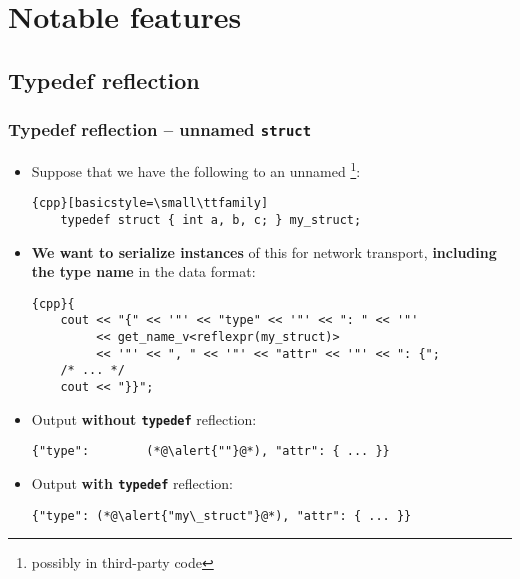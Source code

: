 \documentclass[compress,table,xcolor=table]{beamer}
\begin{document}
\section{Notable features}

\subsection{Typedef reflection}
\begin{frame}[fragile]
\frametitle{Typedef reflection -- unnamed \texttt{struct}}
  \small
  \begin{itemize}
    \item Suppose that we have the following \verb@typedef@ to an unnamed
      \verb@struct@\footnote{possibly in third-party code}:
    \begin{lstlisting}{cpp}[basicstyle=\small\ttfamily]
	typedef struct { int a, b, c; } my_struct;
    \end{lstlisting}
    \item \textbf{We want to serialize instances} of this \verb@struct@
      for network transport, \textbf{including the type name} in the data format:
      \begin{lstlisting}{cpp}{
	cout << "{" << '"' << "type" << '"' << ": " << '"'
	     << get_name_v<reflexpr(my_struct)>
	     << '"' << ", " << '"' << "attr" << '"' << ": {";
	/* ... */
	cout << "}}";
      \end{lstlisting}
    \item Output \textbf{without \texttt{typedef}} reflection:
    \begin{lstlisting}[basicstyle=\small\ttfamily]
	{"type":        (*@\alert{""}@*), "attr": { ... }}
    \end{lstlisting}
    \item Output \textbf{with \texttt{typedef}} reflection:
    \begin{lstlisting}[basicstyle=\small\ttfamily]
	{"type": (*@\alert{"my\_struct"}@*), "attr": { ... }}
    \end{lstlisting}
  \end{itemize}
\end{frame}
\end{document}
